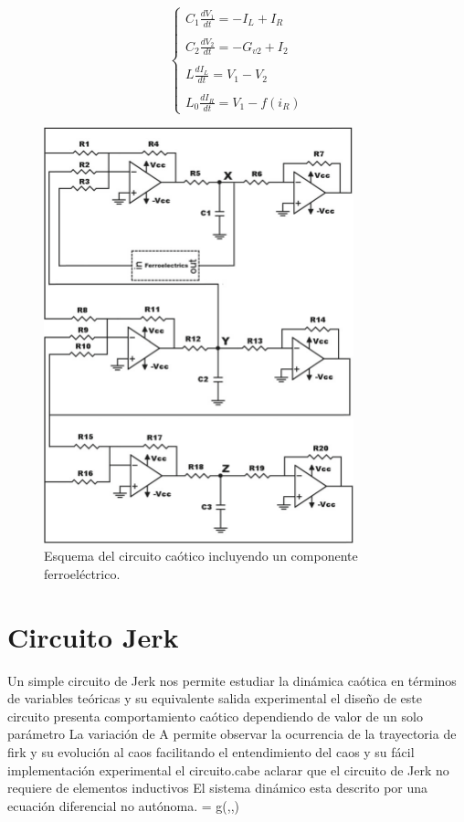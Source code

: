 \documentclass{article}
\begin{document}
\begin{equation}
 \left\lbrace\begin{array}{lcc}
 
  C_{1}\frac{dV_{1}}{dt} =- I_{L}+I_{R} \\\\  
   C_{2}\frac{dV_{2}}{dt} =-G_{v2}+ I_{2} \\\\ 
  L\frac{dI_{L}}{dt} = V_{1}-V_{2}\\\\
  L_{0}\frac{dI_{R}}{dt} = V_{1}-f(i_{R})
  \end{array}\right. 
\label{eq:one}
\end{equation}
  \begin{figure}
        \centering
        \includegraphics[width=0.8\textwidth]{circuitoH/H.png}
        \caption{Esquema del circuito caótico incluyendo un componente ferroeléctrico.
}
        \label{fig:my_label}
    \end{figure}

\section{Circuito Jerk}
Un simple circuito de Jerk nos permite estudiar la dinámica caótica en términos de variables teóricas y su equivalente salida experimental el diseño de este circuito presenta comportamiento caótico dependiendo de valor de un solo parámetro La variación de A permite observar la ocurrencia de la trayectoria de firk y su evolución al caos facilitando el entendimiento del caos y su fácil implementación experimental el circuito.cabe aclarar que el circuito de Jerk no requiere de elementos inductivos 
El sistema dinámico esta descrito por una ecuación diferencial no autónoma. 
  = g(,,) \\  
\end{document}
